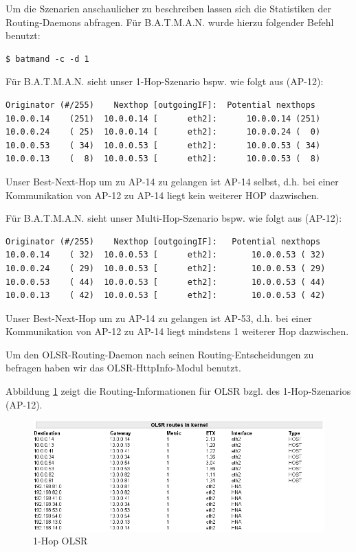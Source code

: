 \documentclass[a4paper,10pt]{article}
\begin{document}
Um die Szenarien anschaulicher zu beschreiben lassen sich die Statistiken der Routing-Daemons abfragen.
Für B.A.T.M.A.N. wurde hierzu folgender Befehl benutzt:

\begin{lstlisting}
$ batmand -c -d 1
\end{lstlisting}

Für B.A.T.M.A.N. sieht unser 1-Hop-Szenario bspw. wie folgt aus (AP-12):

\begin{lstlisting}
Originator (#/255)    Nexthop [outgoingIF]:  Potential nexthops
10.0.0.14    (251)  10.0.0.14 [      eth2]:      10.0.0.14 (251) 
10.0.0.24    ( 25)  10.0.0.14 [      eth2]:      10.0.0.24 (  0)
10.0.0.53    ( 34)  10.0.0.53 [      eth2]:      10.0.0.53 ( 34) 
10.0.0.13    (  8)  10.0.0.53 [      eth2]:      10.0.0.53 (  8)  
\end{lstlisting}

Unser Best-Next-Hop um zu AP-14 zu gelangen ist AP-14 selbst, d.h. bei einer Kommunikation von AP-12 zu AP-14 liegt kein weiterer HOP dazwischen.

Für B.A.T.M.A.N. sieht unser Multi-Hop-Szenario bspw. wie folgt aus (AP-12):

\begin{lstlisting}
Originator (#/255)    Nexthop [outgoingIF]:   Potential nexthops
10.0.0.14    ( 32)  10.0.0.53 [      eth2]:       10.0.0.53 ( 32)
10.0.0.24    ( 29)  10.0.0.53 [      eth2]:       10.0.0.53 ( 29)
10.0.0.53    ( 44)  10.0.0.53 [      eth2]:       10.0.0.53 ( 44)
10.0.0.13    ( 42)  10.0.0.53 [      eth2]:       10.0.0.53 ( 42)
\end{lstlisting}

Unser Best-Next-Hop um zu AP-14 zu gelangen ist AP-53, d.h. bei einer Kommunikation von AP-12 zu AP-14 liegt mindstens 1 weiterer Hop dazwischen.

Um den OLSR-Routing-Daemon nach seinen Routing-Entscheidungen zu befragen haben wir das OLSR-HttpInfo-Modul benutzt.

Abbildung \ref{1hop_olsr} zeigt die Routing-Informationen für OLSR bzgl. des 1-Hop-Szenarios (AP-12).

\begin{center}
  \begin{figure}[thb]
    \includegraphics[width=1\textwidth]{1hop_olsr.png}
    \caption{1-Hop OLSR}
    \label{1hop_olsr}
  \end{figure}
\end{center}
\end{document}
